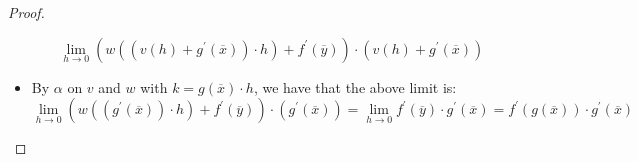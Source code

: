 \begin{proof}
\begin{itemize}
        \[
        \lim_{ h \to 0 } \left( w\left( \left(    v\left( h \right) +  g ^{ \prime } \left( \overline{x}  \right)  \right) \cdot h \right) +  f ^{ \prime } \left( \overline{y}  \right)  \right) \cdot \left(    v\left( h \right) +  g ^{ \prime } \left( \overline{x}  \right)  \right) 
        \]
        \item By $ \alpha  $ on $ v $ and $ w $ with $ k =  g\left( \overline{x}  \right) \cdot h  $, we have that the above limit is:
        \[
        \lim_{ h \to 0 } \left( w\left( \left( g ^{ \prime } \left( \overline{x}  \right)  \right) \cdot h \right) +  f ^{ \prime } \left( \overline{y}  \right)  \right) \cdot \left(     g ^{ \prime } \left( \overline{x}  \right)  \right)  =  \lim_{ h \to 0 } f ^{ \prime } \left( \overline{y}  \right) \cdot g ^{ \prime } \left( \overline{x}  \right) = \boxed{ f ^{  \prime } \left( g\left( \overline{x}  \right)  \right)  \cdot  g ^{ \prime } \left( \overline{x}  \right) }
        \]
    \end{itemize}
\end{proof}
